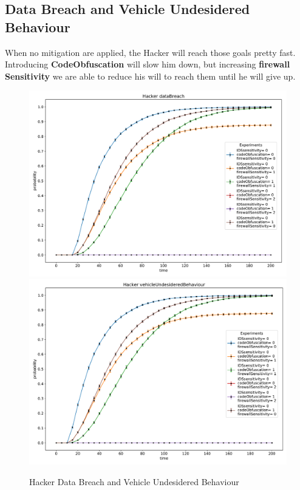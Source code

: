 \subsection*{Data Breach and Vehicle Undesidered Behaviour}
When no mitigation are applied, the Hacker will reach those goals pretty fast. Introducing \textbf{CodeObfuscation}
will slow him down, but increasing \textbf{firewall Sensitivity} we are able to reduce his will to reach them
until he will give up. 
\begin{figure}[H]
    \begin{center}
        \includegraphics[scale=0.4]{img/Hacker_dataBreach.pdf}
        \includegraphics[scale=0.4]{img/Hacker_vOB.pdf}
    \end{center}
    \caption{Hacker Data Breach and Vehicle Undesidered Behaviour}
    \label{fig:Hacker_dataBreach}
    \vspace*{-2cm}
\end{figure}
